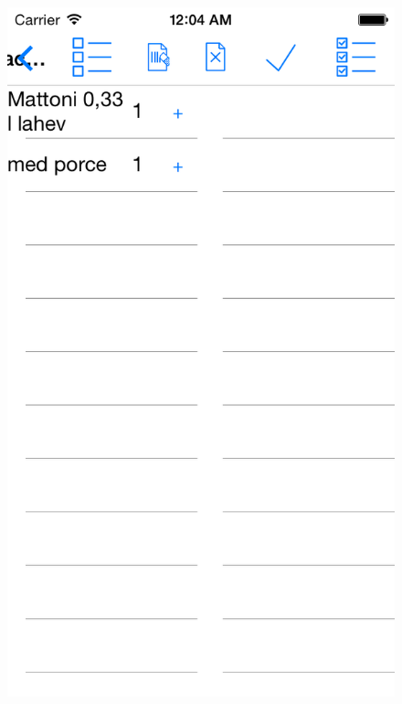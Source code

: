 \begin{figure}
\centering
\begin{minipage}{.5\textwidth}
  \centering
  \includegraphics[width=.95\textwidth]{pay1.png}
  \label{fig:paypage1}
\end{minipage}%
\begin{minipage}{.5\textwidth}
  \centering

\end{minipage}
\end{figure}
